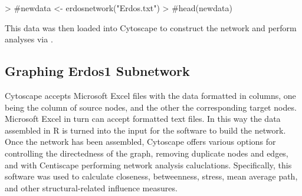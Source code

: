 \documentclass[12pt]{article} %
\begin{document}
\begin{Schunk}
\begin{Sinput}
> #newdata <- erdosnetwork("Erdos.txt")
> #head(newdata)
\end{Sinput}
\end{Schunk}
This data was then loaded into Cytoscape to construct the network and perform analyses via .
  \subsection{Graphing Erdos1 Subnetwork}
  \indent Cytoscape accepts Microsoft Excel files with the data formatted in columns, one being the column of source nodes, and the other the corresponding target nodes. Microsoft Excel in turn can accept formatted text files. In this way the data assembled in R is turned into the input for the software to build the network. Once the network has been assembled, Cytoscape offers various options for controlling the directedness of the graph, removing duplicate nodes and edges, and with Centiscape performing network analysis caluclations. Specifically, this software was used to calculate closeness, betweenness, stress, mean average path, and other structural-related influence measures. 
  
\end{document}
